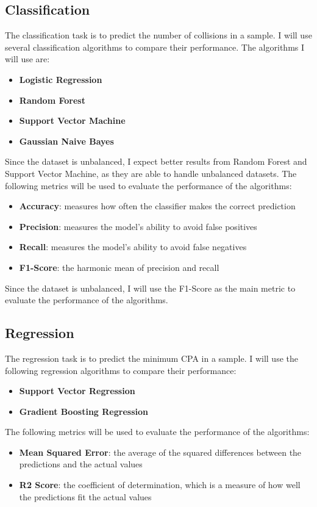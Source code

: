 \subsection{Classification}
The classification task is to predict the number of collisions in a sample. I will use several classification algorithms to compare their performance. The algorithms I will use are:
\begin{itemize}
    \item \textbf{Logistic Regression}
    \item \textbf{Random Forest}
    \item \textbf{Support Vector Machine}
    \item \textbf{Gaussian Naive Bayes}
\end{itemize}
Since the dataset is unbalanced, I expect better results from Random Forest and Support Vector Machine, as they are able to handle unbalanced datasets.
The following metrics will be used to evaluate the performance of the algorithms:
\begin{itemize}
    \item \textbf{Accuracy}: measures how often the classifier makes the correct prediction
    \item \textbf{Precision}: measures the model's ability to avoid false positives
    \item \textbf{Recall}: measures the model's ability to avoid false negatives
    \item \textbf{F1-Score}: the harmonic mean of precision and recall
\end{itemize}
Since the dataset is unbalanced, I will use the F1-Score as the main metric to evaluate the performance of the algorithms.

\subsection{Regression}
The regression task is to predict the minimum CPA in a sample. I will use the following regression algorithms to compare their performance:
\begin{itemize}
    \item \textbf{Support Vector Regression}
    \item \textbf{Gradient Boosting Regression}
\end{itemize}
The following metrics will be used to evaluate the performance of the algorithms:
\begin{itemize}
    \item \textbf{Mean Squared Error}: the average of the squared differences between the predictions and the actual values
    \item \textbf{R2 Score}: the coefficient of determination, which is a measure of how well the predictions fit the actual values
\end{itemize}
